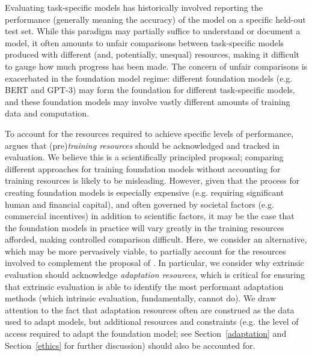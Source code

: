 Evaluating task-specific models has historically involved reporting the performance (generally meaning the accuracy) of the model on a specific held-out test set. While this paradigm may partially suffice to understand or document a model, it often amounts to unfair comparisons between task-specific models produced with different (and, potentially, unequal) resources, making it difficult to gauge how much progress has been made. The concern of unfair comparisons is exacerbated in the foundation model regime: different foundation models (e.g. BERT and GPT-3) may form the foundation for different task-specific models, and these foundation models may involve vastly different amounts of training data and computation.

To account for the resources required to achieve specific levels of performance, \citet{linzen2020} argues that (pre)\textit{training resources} should be acknowledged and tracked in evaluation. We believe this is a scientifically principled proposal; comparing different approaches for training foundation models without accounting for training resources is likely to be misleading. However, given that the process for creating foundation models is especially expensive (e.g. requiring significant human and financial capital), and often governed by societal factors (e.g. commercial incentives) in addition to scientific factors, it may be the case that the foundation models in practice will vary greatly in the training resources afforded, making controlled comparison difficult. Here, we consider an alternative, which may be more pervasively viable, to partially account for the resources involved to complement the proposal of \citet{linzen2020}.
In particular, we consider why extrinsic evaluation should acknowledge \textit{adaptation resources}, which is critical for ensuring that extrinsic evaluation is able to identify the most performant adaptation methods (which intrinsic evaluation, fundamentally, cannot do). We draw attention to the fact that adaptation resources often are construed as the data used to adapt models, but additional resources \citep[e.g. data used to choose adaptation methods;][]{perez2021true} and constraints (e.g. the level of access required to adapt the foundation model; see Section~\ref{adaptation} and Section~\ref{ethics} for further discussion) should also be accounted for.

